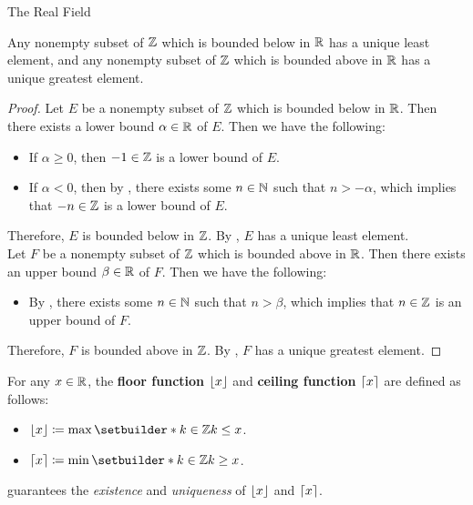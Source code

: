 \begin{section}{The Real Field}
\bigskip

\begin{theorem} \label{thm:BoundedSubsetOfZInRHasExtremum}
    Any nonempty subset of $\mathbb{Z}$ which is bounded below in $\mathbb{R}$ has a unique least element,
    and any nonempty subset of $\mathbb{Z}$ which is bounded above in $\mathbb{R}$ has a unique greatest element.
\end{theorem}

\begin{proof}
    Let $E$ be a nonempty subset of $\mathbb{Z}$ which is bounded below in $\mathbb{R}$. Then there exists a lower bound $\alpha \in \mathbb{R}$
    of $E$. Then we have the following:
    \begin{itemize}
        \item If $\alpha \geq 0$, then $-1 \in \mathbb{Z}$ is a lower bound of $E$.
        \item If $\alpha < 0$, then by , there exists some $n \in \mathbb{N}$
        such that $n > - \alpha$, which implies that $-n \in \mathbb{Z}$ is a lower bound of $E$.
    \end{itemize}
    Therefore, $E$ is bounded below in $\mathbb{Z}$. By , $E$ has a unique least element.
    \\[6mm]
    Let $F$ be a nonempty subset of $\mathbb{Z}$ which is bounded above in $\mathbb{R}$. Then there exists an upper bound $\beta \in \mathbb{R}$
    of $F$. Then we have the following:
    \begin{itemize}
        \item By , there exists some $n \in \mathbb{N}$
        such that $n > \beta$, which implies that $n \in \mathbb{Z}$ is an upper bound of $F$.
    \end{itemize}
    Therefore, $F$ is bounded above in $\mathbb{Z}$. By , $F$ has a unique greatest element.
\end{proof}

\bigskip

\begin{definition} \label{def:FloorCeilingFunctions}
    For any $x \in \mathbb{R}$, the \textbf{floor function} $\lfloor x\rfloor$
    and \textbf{ceiling function} $\lceil x\rceil$ are defined as follows:
    \begin{itemize}
        \item $\floor{x} \coloneqq \max\setbuilder*{k \in \Z}{k \leq x}$.
        \item $\ceil{x} \coloneqq \min\setbuilder*{k \in \Z}{k \geq x}$.
    \end{itemize}
     guarantees the
    \emph{existence} and \emph{uniqueness} of $\lfloor x\rfloor$ and $\lceil x\rceil$.
\end{definition}


\end{section}
